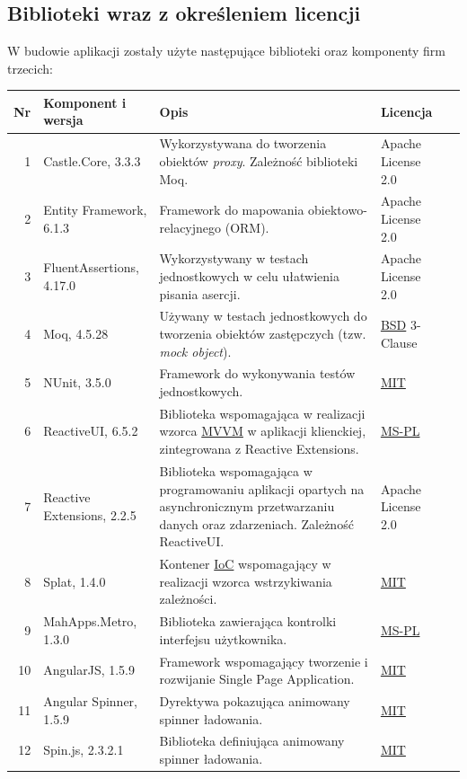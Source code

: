 \documentclass[10pt,a4paper]{article}
\begin{document}
\subsection{Biblioteki wraz z określeniem licencji}
W budowie aplikacji zostały użyte następujące biblioteki oraz komponenty firm trzecich:

\begin{table}[H]
	\begin{tabularx}{\textwidth}{|r|l|X|l|c|}
		\hline
		\textbf{Nr} & \textbf{Komponent i wersja} & \textbf{Opis} & \textbf{Licencja} & \\
		\hline
		1 & 
		Castle.Core, 3.3.3 &
		Wykorzystywana do tworzenia obiektów \textit{proxy}. Zależność biblioteki Moq. &
		Apache License 2.0 &
		\cite{castlecore} \\
		\hline
		2 &
		Entity Framework, 6.1.3 &
		Framework do mapowania obiektowo-relacyjnego (ORM). &
		Apache License 2.0 &
		\cite{entityframework} \\
		\hline
		3 &
		FluentAssertions, 4.17.0 &
		Wykorzystywany w testach jednostkowych w celu ułatwienia pisania asercji. &
		Apache License 2.0 &
		\cite{fluentassertions} \\
		\hline
		4 &
		Moq, 4.5.28 &
		Używany w testach jednostkowych do tworzenia obiektów zastępczych (tzw. \emph{mock object}). &
		\mbox{\hyperref[abbr:bsd]{BSD}} 3-Clause &
		\cite{moq} \\
		\hline
		5 &
		NUnit, 3.5.0 &
		Framework do wykonywania testów jednostkowych. &
		\mbox{\hyperref[abbr:mit]{MIT}} &
		\cite{nunit} \\
		\hline
		6 &
		ReactiveUI, 6.5.2 &
		Biblioteka wspomagająca w realizacji wzorca \hyperref[abbr:mvvm]{MVVM} w aplikacji klienckiej, zintegrowana z Reactive Extensions. &
		\mbox{\hyperref[abbr:mspl]{MS-PL}} &
		\cite{reactiveui} \\
		\hline
		7 &
		Reactive Extensions, 2.2.5 &
		Biblioteka wspomagająca w programowaniu aplikacji opartych na asynchronicznym przetwarzaniu danych oraz zdarzeniach. Zależność ReactiveUI. &
		Apache License 2.0 &
		\cite{reactiveextensions} \\
		\hline
		8 &
		Splat, 1.4.0 &
		Kontener \hyperref[abbr:ioc]{IoC} wspomagający w realizacji wzorca wstrzykiwania zależności. &
		\mbox{\hyperref[abbr:mit]{MIT}} &
		\cite{splat} \\
		\hline
		9 &
		MahApps.Metro, 1.3.0 &
		Biblioteka zawierająca kontrolki interfejsu użytkownika. &
		\mbox{\hyperref[abbr:mspl]{MS-PL}} &
		\cite{mahapps} \\
		\hline
		10 &
		AngularJS, 1.5.9 &
		Framework wspomagający tworzenie i rozwijanie Single Page Application. &
		\mbox{\hyperref[abbr:mit]{MIT}} &
		\cite{angularjs} \\
		\hline
		11 &
		Angular Spinner, 1.5.9 &
		Dyrektywa pokazująca animowany spinner ładowania. &
		\mbox{\hyperref[abbr:mit]{MIT}} &
		\cite{angularspinner} \\
		\hline
		12 &
		Spin.js, 2.3.2.1 &
		Biblioteka definiująca animowany spinner ładowania. &
		\mbox{\hyperref[abbr:mit]{MIT}} &
		\cite{spinjs} \\
		\hline
	\end{tabularx}
\end{table}
\end{document}
